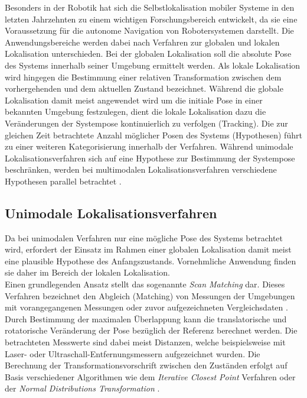 Besonders in der Robotik hat sich die Selbstlokalisation mobiler Systeme in den letzten Jahrzehnten zu einem wichtigen Forschungsbereich entwickelt, da sie eine Voraussetzung für die autonome Navigation von Robotersystemen darstellt. Die Anwendungsbereiche werden dabei nach Verfahren zur globalen und lokalen Lokalisation unterschieden. Bei der globalen Lokalisation soll die absolute Pose des Systems innerhalb seiner Umgebung ermittelt werden. Als lokale Lokalisation wird hingegen die Bestimmung einer relativen Transformation zwischen dem vorhergehenden und dem aktuellen Zustand bezeichnet. Während die globale Lokalisation damit meist angewendet wird um die initiale Pose in einer bekannten Umgebung festzulegen, dient die lokale Lokalisation dazu die Veränderungen der Systempose kontinuierlich zu verfolgen (Tracking). Die zur gleichen Zeit betrachtete Anzahl möglicher Posen des Systems (Hypothesen) führt zu einer weiteren Kategorisierung innerhalb der Verfahren. Während unimodale Lokalisationsverfahren sich auf eine Hypothese zur Bestimmung der Systempose beschränken, werden bei multimodalen Lokalisationsverfahren verschiedene Hypothesen parallel betrachtet \cite{Hertzberg2012}.
\subsection{Unimodale Lokalisationsverfahren}
\label{chap.unimod}
Da bei unimodalen Verfahren nur eine mögliche Pose des Systems betrachtet wird, erfordert der Einsatz im Rahmen einer globalen Lokalisation damit meist eine  plausible Hypothese des Anfangszustands. Vornehmliche Anwendung finden sie daher im Bereich der lokalen Lokalisation.\\

Einen grundlegenden Ansatz stellt das sogenannte \textit{Scan Matching} dar. Dieses Verfahren bezeichnet den Abgleich (Matching) von Messungen der Umgebungen mit vorangegangenen Messungen \cite{Gutmann1996} oder zuvor aufgezeichneten Vergleichsdaten \cite{Gutmann1998}. Durch Bestimmung der maximalen Überlappung kann die translatorische und rotatorische Veränderung der Pose bezüglich der Referenz berechnet werden. Die betrachteten Messwerte sind dabei meist Distanzen, welche beispielsweise mit Laser- \cite{Diosi2007} oder Ultraschall-Entfernungsmessern \cite{Burguera2005} aufgezeichnet wurden. Die Berechnung der Transformationsvorschrift zwischen den Zuständen erfolgt auf Basis verschiedener Algorithmen wie dem \textit{Iterative Closest Point} Verfahren \cite{Besl1992}\cite{Lu1994} oder der \textit{Normal Distributions Transformation} \cite{Biber2003}.\\

